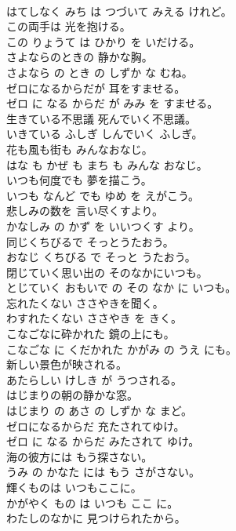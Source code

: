 \documentclass[8pt]{extreport}
\begin{document}
\begin{CJK}{UTF8}{min}
\\	はてしなく みち は つづいて みえる けれど。	
\\	この両手は 光を抱ける。	
\\	この りょうて は ひかり を いだける。	
\\	さよならのときの 静かな胸。	
\\	さよなら の とき の しずか な むね。	
\\	ゼロになるからだが 耳をすませる。	
\\	ゼロ に なる からだ が みみ を すませる。	
\\	生きている不思議 死んでいく不思議。	
\\	いきている ふしぎ しんでいく ふしぎ。	
\\	花も風も街も みんなおなじ。	
\\	はな も かぜ も まち も みんな おなじ。	
\\	いつも何度でも 夢を描こう。	
\\	いつも なんど でも ゆめ を えがこう。	
\\	悲しみの数を 言い尽くすより。	
\\	かなしみ の かず を いいつくす より。	
\\	同じくちびるで そっとうたおう。	
\\	おなじ くちびる で そっと うたおう。	
\\	閉じていく思い出の そのなかにいつも。	
\\	とじていく おもいで の その なか に いつも。	
\\	忘れたくない ささやきを聞く。	
\\	わすれたくない ささやき を きく。	
\\	こなごなに砕かれた 鏡の上にも。	
\\	こなごな に くだかれた かがみ の うえ にも。	
\\	新しい景色が映される。	
\\	あたらしい けしき が うつされる。	
\\	はじまりの朝の静かな窓。	
\\	はじまり の あさ の しずか な まど。	
\\	ゼロになるからだ 充たされてゆけ。	
\\	ゼロ に なる からだ みたされて ゆけ。	
\\	海の彼方には もう探さない。	
\\	うみ の かなた には もう さがさない。	
\\	輝くものは いつもここに。	
\\	かがやく もの は いつも ここ に。	
\\	わたしのなかに 見つけられたから。	

\end{CJK}
\end{document}
